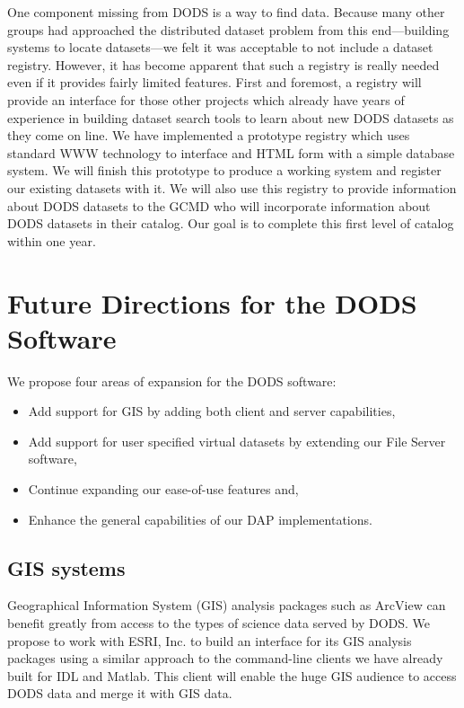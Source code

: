 \documentclass[10pt]{article}
\begin{document}
One component missing from DODS is a way to find data. Because many other
groups had approached the distributed dataset problem from this
end---building systems to locate datasets---we felt it was acceptable to not
include a dataset registry. However, it has become apparent that such a
registry is really needed even if it provides fairly limited features. First
and foremost, a registry will provide an interface for those other projects
which already have years of experience in building dataset search tools to
learn about new DODS datasets as they come on line. We have implemented a
prototype registry which uses standard WWW technology to interface and HTML
form with a simple database system. We will finish this prototype to produce
a working system and register our existing datasets with it. We will also use
this registry to provide information about DODS datasets to the GCMD who will
incorporate information about DODS datasets in their catalog. Our goal is to
complete this first level of catalog within one year.

\section{Future Directions for the DODS Software}

We propose four areas of expansion for the DODS software:
\begin{itemize}
\item Add support for GIS by adding both client and server capabilities,
\item Add support for user specified virtual datasets by extending our File
  Server software,
\item Continue expanding our ease-of-use features and,
\item Enhance the general capabilities of our DAP implementations.
\end{itemize}

\subsection{GIS systems}
Geographical Information System (GIS) analysis packages such as ArcView can
benefit greatly from access to the types of science data served by DODS. We
propose to work with ESRI, Inc. to build an interface for its GIS analysis
packages using a similar approach to the command-line clients we have already
built for IDL and Matlab. This client will enable the huge GIS audience to
access DODS data and merge it with GIS data.
\end{document}

